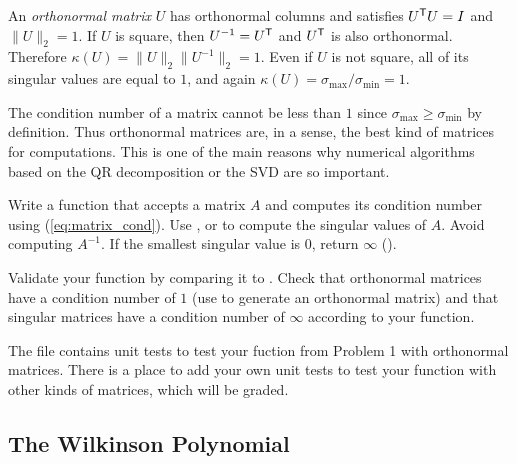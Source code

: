 \begin{info} %
An \emph{orthonormal matrix} $U$ has orthonormal columns and satisfies $U^{\mathsf T} U = I$ and $\|U\|_2 = 1$.
If $U$ is square, then $U^{-1} = U^{\mathsf T}$ and $U^{\mathsf T}$ is also orthonormal.
Therefore $\kappa(U) = \|U\|_2\|U^{-1}\|_2 = 1$.
Even if $U$ is not square, all of its singular values are equal to $1$, and again $\kappa(U) = \sigma_{\max} / \sigma_{\min} = 1$.

The condition number of a matrix cannot be less than $1$ since $\sigma_{\max} \ge \sigma_{\min}$ by definition.
Thus orthonormal matrices are, in a sense, the best kind of matrices for computations.
This is one of the main reasons why numerical algorithms based on the QR decomposition or the SVD are so important.
\end{info}

\begin{problem} %
Write a function that accepts a matrix $A$ and computes its condition number using (\ref{eq:matrix_cond}).
Use , or  to compute the singular values of $A$.
Avoid computing $A^{-1}$.
If the smallest singular value is $0$, return $\infty$ ().

Validate your function by comparing it to .
Check that orthonormal matrices have a condition number of $1$ (use  to generate an orthonormal matrix) and that singular matrices have a condition number of $\infty$ according to your function.
\end{problem}

\begin{unittest}
The file  contains unit tests to test your fuction from Problem 1 with orthonormal matrices.
There is a place to add your own unit tests to test your function with other kinds of matrices, which will be graded.
\end{unittest}


\subsection*{The Wilkinson Polynomial} %

